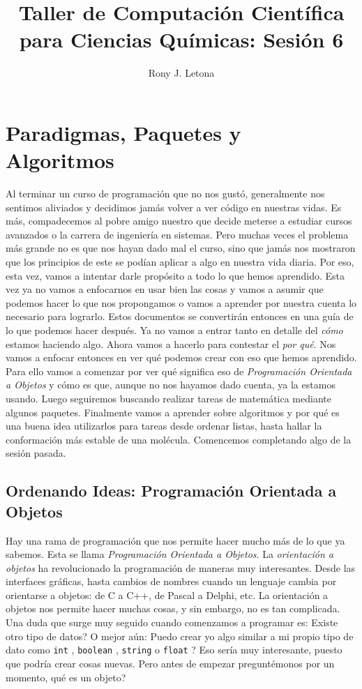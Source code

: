 \documentclass[10pt,letterpaper]{article}
\author{Rony J. Letona}
\title{Taller de Computaci\'on Cient\'ifica para Ciencias Qu\'imicas: Sesi\'on 6}
\newcommand{\inlinecode}[1]{
\colorbox{light-gray}{\texttt{#1}}
}
\begin{document}
\maketitle

\section{Paradigmas, Paquetes y Algoritmos}
Al terminar un curso de programaci\'on que no nos gust\'o, generalmente nos sentimos aliviados y decidimos jam\'as volver a ver c\'odigo en nuestras vidas. Es m\'as, compadecemos al pobre amigo nuestro que decide meterse a estudiar cursos avanzados o la carrera de ingenier\'ia en sistemas. Pero muchas veces el problema m\'as grande no es que nos hayan dado mal el curso, sino que jam\'as nos mostraron que los principios de este se pod\'ian aplicar a algo en nuestra vida diaria. Por eso, esta vez, vamos a intentar darle prop\'osito a todo lo que hemos aprendido. Esta vez ya no vamos a enfocarnos en usar bien las cosas y vamos a asumir que podemos hacer lo que nos propongamos o vamos a aprender por nuestra cuenta lo necesario para lograrlo. Estos documentos se convertir\'an entonces en una gu\'ia de lo que podemos hacer despu\'es. Ya no vamos a entrar tanto en detalle del \emph{c\'omo} estamos haciendo algo. Ahora vamos a hacerlo para contestar el \emph{por qu\'e}. Nos vamos a enfocar entonces en ver qu\'e podemos crear con eso que hemos aprendido. Para ello vamos a comenzar por ver qu\'e significa eso de \emph{Programaci\'on Orientada a Objetos} y c\'omo es que, aunque no nos hayamos dado cuenta, ya la estamos usando. Luego seguiremos buscando realizar tareas de matem\'atica mediante algunos paquetes. Finalmente vamos a aprender sobre algoritmos y por qu\'e es una buena idea utilizarlos para tareas desde ordenar listas, hasta hallar la conformaci\'on m\'as estable de una mol\'ecula. Comencemos completando algo de la sesi\'on pasada.

\subsection{Ordenando Ideas: Programaci\'on Orientada a Objetos}
Hay una rama de programaci\'on que nos permite hacer mucho m\'as de lo que ya sabemos. Esta se llama \emph{Programaci\'on Orientada a Objetos}. La \emph{orientaci\'on a objetos} ha revolucionado la programaci\'on de maneras muy interesantes. Desde las interfaces gr\'aficas, hasta cambios de nombres cuando un lenguaje cambia por orientarse a objetos: de C a C++, de Pascal a Delphi, etc. La orientaci\'on a objetos nos permite hacer muchas cosas, y sin embargo, no es tan complicada. Una duda que surge muy seguido cuando comenzamos a programar es: Existe otro tipo de datos? O mejor a\'un: Puedo crear yo algo similar a mi propio tipo de dato como \inlinecode{int}, \inlinecode{boolean}, \inlinecode{string} o \inlinecode{float}? Eso ser\'ia muy interesante, puesto que podr\'ia crear cosas nuevas. Pero antes de empezar pregunt\'emonos por un momento, qu\'e es un objeto?\\
\end{document}
